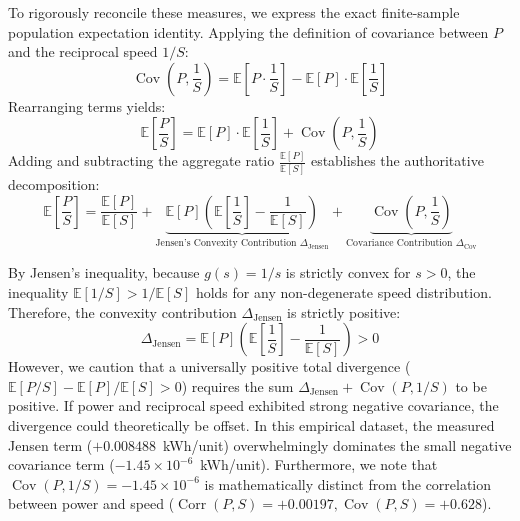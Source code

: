 \documentclass[journal]{IEEEtran}
\begin{document}
To rigorously reconcile these measures, we express the exact finite-sample population expectation identity. Applying the definition of covariance between $P$ and the reciprocal speed $1/S$:
\begin{equation}
\operatorname{Cov}\left(P, \frac{1}{S}\right) = \mathbb{E}\left[P \cdot \frac{1}{S}\right] - \mathbb{E}[P] \cdot \mathbb{E}\left[\frac{1}{S}\right]
\end{equation}
Rearranging terms yields:
\begin{equation}
\mathbb{E}\left[\frac{P}{S}\right] = \mathbb{E}[P] \cdot \mathbb{E}\left[\frac{1}{S}\right] + \operatorname{Cov}\left(P, \frac{1}{S}\right)
\end{equation}
Adding and subtracting the aggregate ratio $\frac{\mathbb{E}[P]}{\mathbb{E}[S]}$ establishes the authoritative decomposition:
\begin{equation}
\label{eq:sec_decomposition}
\mathbb{E}\left[\frac{P}{S}\right] = \frac{\mathbb{E}[P]}{\mathbb{E}[S]} + \underbrace{\mathbb{E}[P] \left( \mathbb{E}\left[\frac{1}{S}\right] - \frac{1}{\mathbb{E}[S]} \right)}_{\text{Jensen's Convexity Contribution } \Delta_{\text{Jensen}}} + \underbrace{\operatorname{Cov}\left(P, \frac{1}{S}\right)}_{\text{Covariance Contribution } \Delta_{\text{Cov}}}
\end{equation}

By Jensen's inequality, because $g(s) = 1/s$ is strictly convex for $s > 0$, the inequality $\mathbb{E}[1/S] > 1/\mathbb{E}[S]$ holds for any non-degenerate speed distribution. Therefore, the convexity contribution $\Delta_{\text{Jensen}}$ is strictly positive:
\begin{equation}
\Delta_{\text{Jensen}} = \mathbb{E}[P] \left( \mathbb{E}\left[\frac{1}{S}\right] - \frac{1}{\mathbb{E}[S]} \right) > 0
\end{equation}
However, we caution that a universally positive total divergence ($\mathbb{E}[P/S] - \mathbb{E}[P]/\mathbb{E}[S] > 0$) requires the sum $\Delta_{\text{Jensen}} + \operatorname{Cov}(P, 1/S)$ to be positive. If power and reciprocal speed exhibited strong negative covariance, the divergence could theoretically be offset. In this empirical dataset, the measured Jensen term ($+0.008488$~kWh/unit) overwhelmingly dominates the small negative covariance term ($-1.45 \times 10^{-6}$~kWh/unit). Furthermore, we note that $\operatorname{Cov}(P, 1/S) = -1.45 \times 10^{-6}$ is mathematically distinct from the correlation between power and speed ($\operatorname{Corr}(P, S) = +0.00197, \operatorname{Cov}(P, S) = +0.628$).
\end{document}
